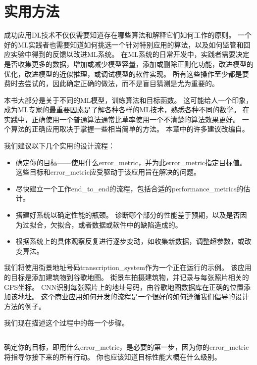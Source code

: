 \chapter{实用方法}
\label{chap:practical_methodology}
成功应用\gls{DL}技术不仅仅需要知道存在哪些算法和解释它们如何工作的原则。
一个好的\gls{ML}实践者也需要知道如何挑选一个针对特别应用的算法，以及如何监管和回应实验中得到的反馈以改进\gls{ML}系统。
在\gls{ML}系统的日常开发中，实践者需要决定是否收集更多的数据，增加或减少模型容量，添加或删除正则化功能，改进模型的优化，改进模型的近似推理，或调试模型的软件实现。
所有这些操作至少都是要费时去尝试的，因此确定正确的做法，而不是盲目猜测是尤为重要的。

本书大部分是关于不同的\gls{ML}模型，训练算法和目标函数。
这可能给人一个印象，成为\gls{ML}专家的最重要因素是了解各种各样的\gls{ML}技术，熟悉各种不同的数学。
在实践中，正确使用一个普通算法通常比草率使用一个不清楚的算法效果更好。
一个算法的正确应用取决于掌握一些相当简单的方法。
本章中的许多建议改编自\cite{ng-lecture-advice}。

我们建议以下几个实用的设计流程：
\begin{itemize}
\item 确定你的目标——使用什么\gls{error_metric}，并为此\gls{error_metric}指定目标值。
这些目标和\gls{error_metric}应受驱动于该应用旨在解决的问题。


\item 尽快建立一个工作\gls{end_to_end}的流程，包括合适的\gls{performance_metrics}的估计。

\item 搭建好系统以确定性能的瓶颈。
诊断哪个部分的性能差于预期，以及是否因为过拟合，欠拟合，或者数据或软件中的缺陷造成的。

\item 根据系统上的具体观察反复进行逐步变动，如收集新数据，调整超参数，或改变算法。
\end{itemize}

我们将使用街景地址号码\gls{transcription_system}\citep{Goodfellow+et+al-ICLR2014a}作为一个正在运行的示例。
该应用的目标是添加建筑物到谷歌地图。
街景车拍摄建筑物，并记录与每张照片相关的GPS坐标。
\gls{CNN}识别每张照片上的地址号码，由谷歌地图数据库在正确的位置添加该地址。
这个商业应用如何开发的流程是一个很好的如何遵循我们倡导的设计方法的例子。

我们现在描述这个过程中的每一个步骤。

\section{}
\label{sec:performance_metrics}
确定你的目标，即用什么\gls{error_metric}，是必要的第一步，因为你的\gls{error_metric}将指导你接下来的所有行动。
你也应该知道目标性能大概在什么级别。


